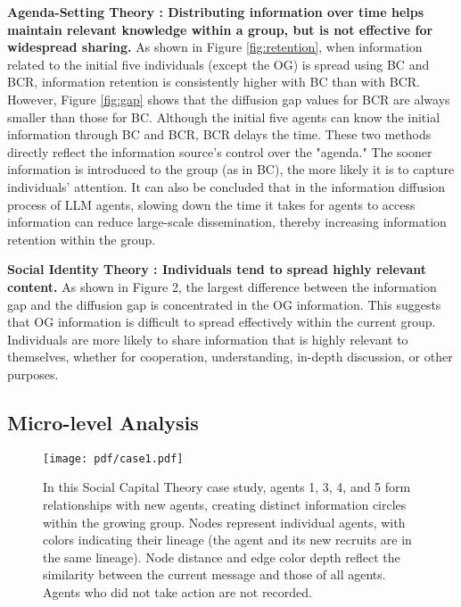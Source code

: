 \noindent \textbf{Agenda-Setting Theory \cite{b71}: Distributing information over time helps maintain relevant knowledge within a group, but is not effective for widespread sharing.} \quad
As shown in Figure \ref{fig:retention}, when information related to the initial five individuals (except the OG) is spread using BC and BCR, information retention is consistently higher with BC than with BCR. However, Figure \ref{fig:gap} shows that the diffusion gap values for BCR are always smaller than those for BC.
Although the initial five agents can know the initial information through BC and BCR, BCR delays the time. 
These two methods directly reflect the information source's control over the "agenda." The sooner information is introduced to the group (as in BC), the more likely it is to capture individuals' attention.
It can also be concluded that in the information diffusion process of LLM agents, slowing down the time it takes for agents to access information can reduce large-scale dissemination, thereby increasing information retention within the group.



\noindent \textbf{Social Identity Theory \cite{b72}: Individuals tend to spread highly relevant content.} \quad As shown in Figure 2, the largest difference between the information gap and the diffusion gap is concentrated in the OG information. This suggests that OG information is difficult to spread effectively within the current group. Individuals are more likely to share information that is highly relevant to themselves, whether for cooperation, understanding, in-depth discussion, or other purposes.






\subsection{Micro-level Analysis}





\begin{figure*}[ht]
    \centering
    \texttt{[image: pdf/case1.pdf]}
    \caption{In this Social Capital Theory case study, agents 1, 3, 4, and 5 form relationships with new agents, creating distinct information circles within the growing group. Nodes represent individual agents, with colors indicating their lineage (the agent and its new recruits are in the same lineage). Node distance and edge color depth reflect the similarity between the current message and those of all agents. Agents who did not take action are not recorded.}
    \label{fig:capital}
\end{figure*}



